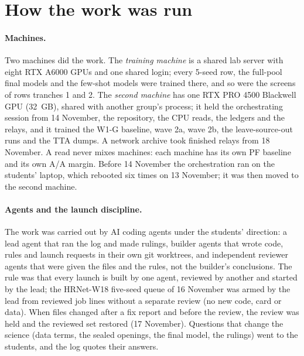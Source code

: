 \section{How the work was run}\label{sec:build-run}

\paragraph{Machines.} Two machines did the work. The \emph{training machine} is a shared lab server with eight RTX A6000 GPUs and
one shared login; every 5-seed row, the full-pool final models and the few-shot models were trained there, and so were the screens of
rows tranches 1 and 2. The \emph{second machine} has one RTX PRO 4500 Blackwell GPU (32~GB), shared with another group's
process; it held the orchestrating session from 14 November, the repository, the CPU reads, the ledgers and the relays, and it trained
the W1-G baseline, wave 2a, wave 2b, the leave-source-out runs and the TTA dumps. A network archive took finished relays from 18
November. A read never mixes machines: each machine has its own PF baseline and its own A/A margin. Before 14 November the
orchestration ran on the students' laptop, which rebooted six times on 13 November; it was then moved to the second machine.

\paragraph{Agents and the launch discipline.} The work was carried out by AI coding agents under the students' direction: a lead
agent that ran the log and made rulings, builder agents that wrote code, rules and launch requests in their own git worktrees, and
independent reviewer agents that were given the files and the rules, not the builder's conclusions. The rule was that every launch
is built by one agent, reviewed by another and started by the lead; the HRNet-W18 five-seed queue of 16 November was armed by the
lead from reviewed job lines without a separate review (no new code, card or data). When files changed after a fix report and
before the review, the review was held and the reviewed set restored (17 November). Questions that change the science (data terms, the sealed openings, the final model, the rulings) went to the students,
and the log quotes their answers.

